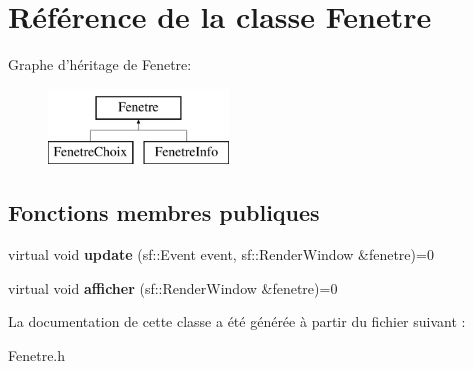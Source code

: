 \hypertarget{classFenetre}{\section{\-Référence de la classe \-Fenetre}
\label{classFenetre}
}
\-Graphe d'héritage de \-Fenetre\-:\begin{figure}[H]
\begin{center}
\leavevmode
\includegraphics[height=2.000000cm]{classFenetre}
\end{center}
\end{figure}
\subsection*{\-Fonctions membres publiques}
\begin{DoxyCompactItemize}
\item 
\hypertarget{classFenetre_a81e85472f9f1994d87bd89bbf3b8bd3c}{virtual void {\bfseries update} (sf\-::\-Event event, sf\-::\-Render\-Window \&fenetre)=0}\label{classFenetre_a81e85472f9f1994d87bd89bbf3b8bd3c}

\item 
\hypertarget{classFenetre_afc2111c7c87beda5a419af6ac81f45c4}{virtual void {\bfseries afficher} (sf\-::\-Render\-Window \&fenetre)=0}\label{classFenetre_afc2111c7c87beda5a419af6ac81f45c4}

\end{DoxyCompactItemize}


\-La documentation de cette classe a été générée à partir du fichier suivant \-:\begin{DoxyCompactItemize}
\item 
\-Fenetre.\-h\end{DoxyCompactItemize}
